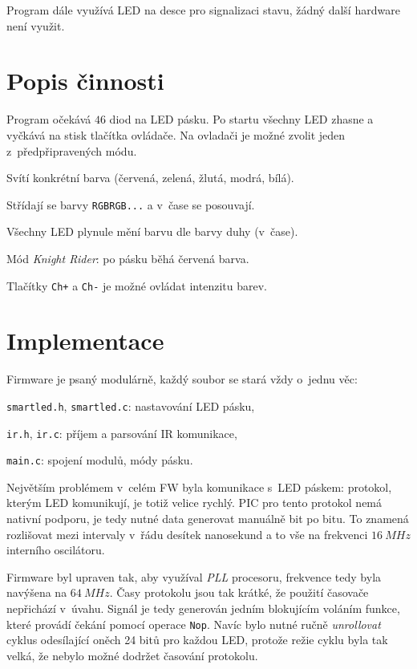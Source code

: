 \documentclass[12pt,a4paper]{article}
\begin{document}
Program dále využívá LED na desce pro signalizaci stavu, žádný další hardware
není využit.

\section{Popis činnosti}

Program očekává $46$ diod na LED pásku. Po startu všechny LED zhasne a vyčkává
na stisk tlačítka ovládače. Na ovladači je možné zvolit jeden z~předpřipravených
módu.

\begin{compactenum}
\item Svítí konkrétní barva (červená, zelená, žlutá, modrá, bílá).
\item Střídají se barvy \texttt{RGBRGB...} a v~čase se posouvají.
\item Všechny LED plynule mění barvu dle barvy duhy (v~čase).
\item Mód \textit{Knight Rider}: po pásku běhá červená barva.
\end{compactenum}

Tlačítky \texttt{Ch+} a \texttt{Ch-} je možné ovládat intenzitu barev.

\section{Implementace}

Firmware je psaný modulárně, každý soubor se stará vždy o~jednu věc:
\begin{compactitem}
	\item \texttt{smartled.h}, \texttt{smartled.c}: nastavování LED pásku,
	\item \texttt{ir.h}, \texttt{ir.c}: příjem a parsování IR komunikace,
	\item \texttt{main.c}: spojení modulů, módy pásku.
\end{compactitem}

Největším problémem v~celém FW byla komunikace s~LED páskem: protokol, kterým
LED komunikují, je totiž velice rychlý. PIC pro tento protokol nemá nativní
podporu, je tedy nutné data generovat manuálně bit po bitu. To znamená
rozlišovat mezi intervaly v~řádu desítek nanosekund a to vše na frekvenci $16\
MHz$ interního oscilátoru.

Firmware byl upraven tak, aby využíval \textit{PLL} procesoru,
frekvence tedy byla navýšena na $64\ MHz$. Časy protokolu jsou tak krátké, že
použití časovače nepřichází v~úvahu. Signál je tedy generován jedním blokujícím
voláním funkce, které provádí čekání pomocí operace \texttt{Nop}.  Navíc bylo
nutné ručně \textit{unrollovat} cyklus odesílající oněch 24 bitů pro každou
LED, protože režie cyklu byla tak velká, že nebylo možné dodržet časování
protokolu.
\end{document}
